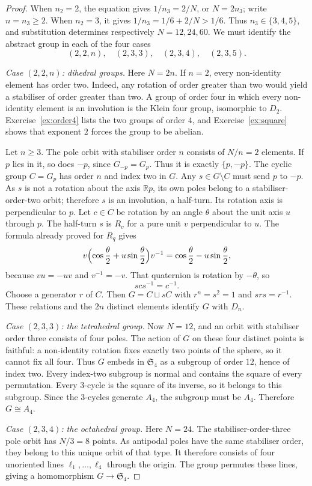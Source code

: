 \begin{proof}
When $n_2=2$, the equation gives
$1/n_3=2/N$, or $N=2n_3$;
write $n=n_3\ge2$.
When $n_2=3$, it gives
$1/n_3=1/6+2/N>1/6$.
Thus $n_3\in\{3,4,5\}$, and
substitution determines respectively
$N=12,24,60$.
We must identify the abstract group
in each of the four cases
\[
(2,2,n),\quad(2,3,3),\quad
(2,3,4),\quad(2,3,5).
\]

\emph{Case $(2,2,n)$: dihedral groups.}
Here $N=2n$. If $n=2$, every
non-identity element has order two.
Indeed, any rotation of order greater
than two would yield a stabiliser
of order greater than two.
A group of order four in which
every non-identity element is an
involution is the Klein four group,
isomorphic to $D_2$. Exercise~\ref{ex:order4} lists the two groups of order $4$, and Exercise~\ref{ex:square} shows that exponent $2$ forces the group to be abelian.

Let $n\ge3$. The pole orbit with
stabiliser order $n$ consists of
$N/n=2$ elements. If $p$ lies in
it, so does $-p$, since
$G_{-p}=G_p$. Thus it is
exactly $\{p,-p\}$.
The cyclic group $C=G_p$ has
order $n$ and index two in $G$.
Any $s\in G\setminus C$ must
send $p$ to $-p$. As $s$ is not
a rotation about the axis $\mathbb Rp$,
its own poles belong to a
stabiliser-order-two orbit;
therefore $s$ is an involution,
a half-turn. Its rotation axis
is perpendicular to $p$.
Let $c\in C$ be rotation by an angle $\theta$ about the unit axis $u$ through $p$. The half-turn $s$ is $R_v$ for a pure unit $v$ perpendicular to $u$. The formula already proved for $R_q$ gives
\[
v\Bigl(\cos\frac\theta2+u\sin\frac\theta2\Bigr)v^{-1}
=\cos\frac\theta2-u\sin\frac\theta2,
\]
because $vu=-uv$ and $v^{-1}=-v$. That quaternion is rotation by $-\theta$, so
\[
scs^{-1}=c^{-1}.
\]
Choose a generator $r$ of $C$.
Then $G=C\sqcup sC$ with
$r^n=s^2=1$ and
$srs=r^{-1}$. These relations
and the $2n$ distinct elements
identify $G$ with $D_n$.

\emph{Case $(2,3,3)$: the tetrahedral group.}
Now $N=12$, and an orbit with
stabiliser order three consists of
four poles. The action of $G$ on
these four distinct points is faithful:
a non-identity rotation fixes
exactly two points of the sphere,
so it cannot fix all four.
Thus $G$ embeds in $\mathfrak S_4$
as a subgroup of order $12$, hence
of index two. Every index-two
subgroup is normal and contains
the square of every permutation.
Every $3$-cycle is the square
of its inverse, so it belongs
to this subgroup. Since the
$3$-cycles generate $A_4$, the
subgroup must be $A_4$.
Therefore $G\cong A_4$.

\emph{Case $(2,3,4)$: the octahedral group.}
Here $N=24$. The stabiliser-order-three
pole orbit has $N/3=8$ points.
As antipodal poles have the same
stabiliser order, they belong to
this unique orbit of that type.
It therefore consists of four
unoriented lines
$\ell_1,\ldots,\ell_4$ through
the origin. The group permutes
these lines, giving a homomorphism
$G\to\mathfrak S_4$.


\end{proof}

